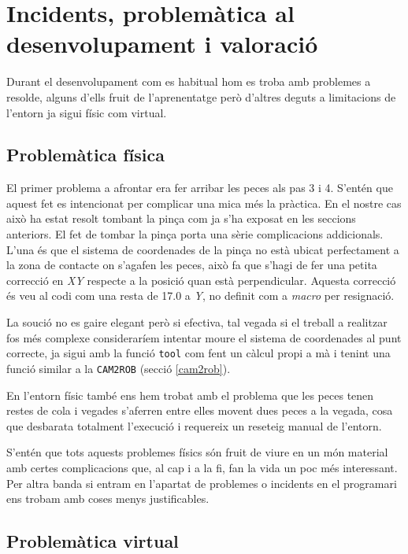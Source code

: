 \section{Incidents, problemàtica al desenvolupament i valoració}\label{incidents}

Durant el desenvolupament com es habitual hom es troba amb problemes a resolde,
alguns d'ells fruit de l'aprenentatge però d'altres deguts a limitacions
de l'entorn ja sigui físic com virtual.

\subsection{Problemàtica física}

El primer problema a afrontar era fer arribar les peces als pas 3 i 4. 
S'entén que aquest fet es intencionat per complicar una mica
més la pràctica. En el nostre cas això ha estat resolt tombant la pinça com ja s'ha exposat en
les seccions anteriors. El fet de tombar la pinça porta una sèrie complicacions 
addicionals. L'una és que el sistema de coordenades de la pinça no està
ubicat perfectament a la zona de contacte on s'agafen les peces, això fa que
s'hagi de fer una petita correcció en \emph{XY} respecte
a la posició quan està perpendicular. Aquesta correcció és veu al codi com una
resta de 17.0 a \emph{Y}, no definit com a \emph{macro} per resignació.

La so\lgem ució no es gaire elegant però si efectiva, tal vegada si el 
treball a realitzar fos més complexe consideraríem intentar moure el sistema
de coordenades al punt correcte, ja sigui amb la funció \texttt{tool}
com fent un càlcul propi a mà i tenint una funció similar a la \texttt{CAM2ROB}
(secció \ref{cam2rob}).

En l'entorn físic també ens hem trobat amb el problema que les peces
tenen restes de cola i vegades s'aferren entre elles movent dues peces a la
vegada, cosa que desbarata totalment l'execució i requereix un reseteig manual
de l'entorn.

S'entén que tots aquests problemes físics són fruit de viure en un món
material amb certes complicacions que, al cap i a la fi, fan la vida un poc més
interessant. Per altra banda si entram en l'apartat de problemes o incidents
en el programari ens trobam amb coses menys justificables.

\subsection{Problemàtica virtual}

